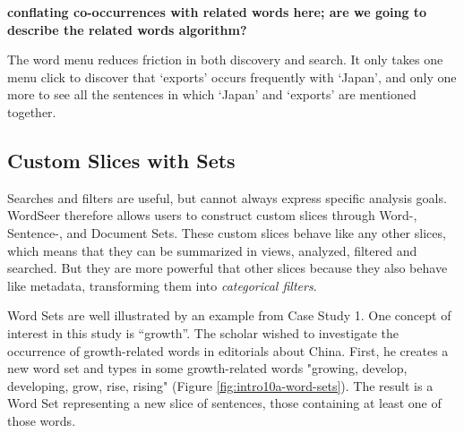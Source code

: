 \documentclass{sig-alternate}
\newcommand{\strong}[1] {\textbf{#1}}
\begin{document}
\strong{conflating co-occurrences with related words here; are we going to describe the related words algorithm?}

The word menu reduces friction in both discovery and search. It only takes one menu click to discover that `exports' occurs frequently with `Japan', and only one more to see all the sentences in which `Japan' and `exports' are mentioned together.  


\subsection{Custom Slices with Sets}

Searches and filters are useful, but cannot always express  specific analysis goals. WordSeer therefore allows users to construct custom slices through Word-, Sentence-, and Document Sets. These custom slices behave like any other slices, which means that they can be summarized in views,  analyzed, filtered and searched. But they are more powerful that other slices because they also behave like metadata, transforming them into \emph{categorical filters}.

Word Sets are well illustrated by an example from Case Study 1.  One concept of interest in this study is ``growth''. The scholar wished to investigate the occurrence of growth-related words in editorials about China.  First, he creates a new word set and types in some growth-related words "growing, develop, developing, grow, rise, rising" (Figure \ref{fig:intro10a-word-sets}). The result is a Word Set representing a new slice of sentences, those containing at least one of those words. 
\end{document}
